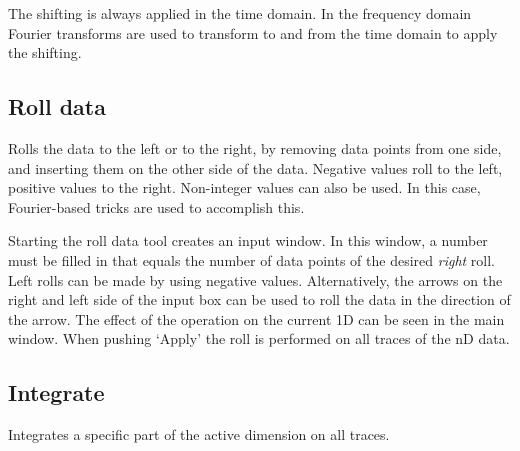 \documentclass[11pt,a4paper]{article}
\begin{document}
The shifting is always applied in the time domain.
In the frequency domain Fourier transforms are used to transform to and from the time domain to apply the shifting.


\subsection{Roll data}
Rolls the data to the left or to the right, by removing data points from one side, and inserting
them on the other side of the data.  Negative values roll to the left, positive values to the
right. Non-integer values can also be used. In this case, Fourier-based tricks are used to accomplish
this.

Starting the roll data tool creates an input window. In this window, a number must be
filled in that equals the number of data points of the desired \textit{right} roll. Left rolls
can be made by using negative values.  Alternatively, the arrows on the right and left side of the
input box can be used to roll the data in the direction of the arrow.  The effect of the operation
on the current 1D can be seen in the main window.  When pushing `Apply' the roll is performed on
all traces of the nD data.

\subsection{Integrate}
Integrates a specific part of the active dimension on all traces.

\end{document}
